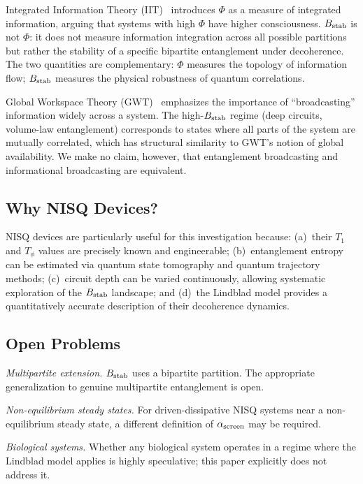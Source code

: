 \documentclass[12pt,letterpaper]{article}
\theoremstyle{definition}
\theoremstyle{remark}
\newcommand{\ascreen}{\alpha_{\rm screen}}
\newcommand{\Bstab}{B_{\rm stab}}
\begin{document}
Integrated Information Theory (IIT)~\cite{tononi2008} introduces $\Phi$ as a measure
of integrated information, arguing that systems with high $\Phi$ have higher
consciousness.
$\Bstab$ is not $\Phi$: it does not measure information integration across all possible
partitions but rather the stability of a specific bipartite entanglement under
decoherence.
The two quantities are complementary: $\Phi$ measures the topology of information flow;
$\Bstab$ measures the physical robustness of quantum correlations.

Global Workspace Theory (GWT)~\cite{baars1997} emphasizes the importance of
``broadcasting'' information widely across a system.
The high-$\Bstab$ regime (deep circuits, volume-law entanglement) corresponds to states
where all parts of the system are mutually correlated, which has structural similarity
to GWT's notion of global availability.
We make no claim, however, that entanglement broadcasting and informational broadcasting
are equivalent.

\subsection{Why NISQ Devices?}

NISQ devices are particularly useful for this investigation because:
(a)~their $T_1$ and $T_\phi$ values are precisely known and engineerable;
(b)~entanglement entropy can be estimated via quantum state tomography and quantum
trajectory methods;
(c)~circuit depth can be varied continuously, allowing systematic exploration of the
$\Bstab$ landscape; and
(d)~the Lindblad model provides a quantitatively accurate description of their
decoherence dynamics.

\subsection{Open Problems}

\begin{description}[noitemsep]
\item[OP-C1] \textit{Multipartite extension.}
      $\Bstab$ uses a bipartite partition.
      The appropriate generalization to genuine multipartite entanglement is open.
\item[OP-C2] \textit{Non-equilibrium steady states.}
      For driven-dissipative NISQ systems near a non-equilibrium steady state, a
      different definition of $\ascreen$ may be required.
\item[OP-C3] \textit{Biological systems.}
      Whether any biological system operates in a regime where the Lindblad model
      applies is highly speculative; this paper explicitly does not address it.
\end{description}
\end{document}
